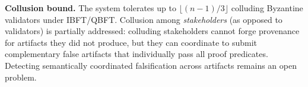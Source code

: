 \textbf{Collusion bound.}
The system tolerates up to $\lfloor (n-1)/3 \rfloor$ colluding Byzantine validators under IBFT/QBFT.
Collusion among \emph{stakeholders} (as opposed to validators) is partially addressed: colluding stakeholders cannot forge provenance for artifacts they did not produce, but they can coordinate to submit complementary false artifacts that individually pass all proof predicates.
Detecting semantically coordinated falsification across artifacts remains an open problem.
